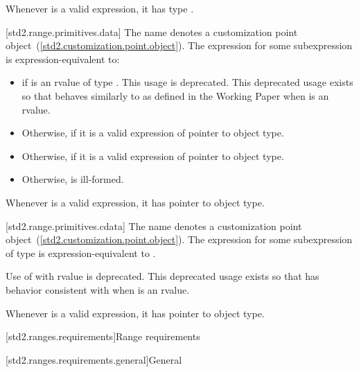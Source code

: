 \pnum
\enternote Whenever  is a valid expression, it
has type . \exitnote

[std2.range.primitives.data]{}
\pnum
The name  denotes a customization point
object~(\ref{std2.customization.point.object}). The expression
 for some subexpression  is
expression-equivalent to:

\begin{itemize}
\item
   if  is an rvalue of
  type . This usage is deprecated. \enternote
  This deprecated usage exists so that  behaves
  similarly to  as defined in the \Cpp Working
  Paper when  is an rvalue. \exitnote

\item
  Otherwise,  if it is a valid expression of pointer to object type.

\item
  Otherwise,  if it is a valid expression of pointer to object type.

\item
  Otherwise,  is ill-formed.
\end{itemize}

\pnum
\enternote Whenever  is a valid expression, it
has pointer to object type. \exitnote

[std2.range.primitives.cdata]{}
\pnum
The name  denotes a customization point
object~(\ref{std2.customization.point.object}). The expression
 for some subexpression  of type 
is expression-equivalent to .

\pnum
Use of  with rvalue  is deprecated.
\enternote This deprecated usage exists so that 
has behavior consistent with  when  is
an rvalue. \exitnote

\pnum
\enternote Whenever  is a valid expression, it
has pointer to object type. \exitnote

[std2.ranges.requirements]{Range requirements}

[std2.ranges.requirements.general]{General}

